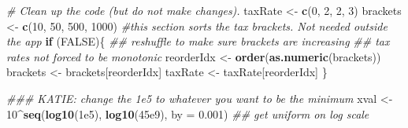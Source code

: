 \documentclass[]{article}
\newenvironment{Shaded}{\begin{snugshade}}{\end{snugshade}}
\newcommand{\CommentTok}[1]{\textcolor[rgb]{0.56,0.35,0.01}{\textit{#1}}}
\newcommand{\ControlFlowTok}[1]{\textcolor[rgb]{0.13,0.29,0.53}{\textbf{#1}}}
\newcommand{\DataTypeTok}[1]{\textcolor[rgb]{0.13,0.29,0.53}{#1}}
\newcommand{\DecValTok}[1]{\textcolor[rgb]{0.00,0.00,0.81}{#1}}
\newcommand{\FloatTok}[1]{\textcolor[rgb]{0.00,0.00,0.81}{#1}}
\newcommand{\KeywordTok}[1]{\textcolor[rgb]{0.13,0.29,0.53}{\textbf{#1}}}
\newcommand{\NormalTok}[1]{#1}
\newcommand{\OperatorTok}[1]{\textcolor[rgb]{0.81,0.36,0.00}{\textbf{#1}}}
\newcommand{\OtherTok}[1]{\textcolor[rgb]{0.56,0.35,0.01}{#1}}
\newcommand{\StringTok}[1]{\textcolor[rgb]{0.31,0.60,0.02}{#1}}
\begin{document}
\begin{Shaded}
\begin{Highlighting}[]
\CommentTok{# Clean up the code (but do not make changes). }
\NormalTok{taxRate <-}\StringTok{ }\KeywordTok{c}\NormalTok{(}\DecValTok{0}\NormalTok{, }\DecValTok{2}\NormalTok{, }\DecValTok{2}\NormalTok{, }\DecValTok{3}\NormalTok{) }
\NormalTok{brackets <-}\StringTok{ }\KeywordTok{c}\NormalTok{(}\DecValTok{10}\NormalTok{, }\DecValTok{50}\NormalTok{, }\DecValTok{500}\NormalTok{, }\DecValTok{1000}\NormalTok{)}
\CommentTok{#this section sorts the tax brackets. Not needed outside the app    }
\ControlFlowTok{if}\NormalTok{ (}\OtherTok{FALSE}\NormalTok{)\{          }
    \CommentTok{## reshuffle to make sure brackets are increasing}
    \CommentTok{## tax rates not forced to be monotonic}
\NormalTok{    reorderIdx <-}\StringTok{ }\KeywordTok{order}\NormalTok{(}\KeywordTok{as.numeric}\NormalTok{(brackets))}
\NormalTok{    brackets <-}\StringTok{ }\NormalTok{brackets[reorderIdx]}
\NormalTok{    taxRate <-}\StringTok{ }\NormalTok{taxRate[reorderIdx]}
\NormalTok{\}}
    
\CommentTok{### KATIE: change the 1e5 to whatever you want to be the minimum}
\NormalTok{xval <-}\StringTok{ }\DecValTok{10}\OperatorTok{^}\KeywordTok{seq}\NormalTok{(}\KeywordTok{log10}\NormalTok{(}\FloatTok{1e5}\NormalTok{), }\KeywordTok{log10}\NormalTok{(}\FloatTok{45e9}\NormalTok{), }\DataTypeTok{by =} \FloatTok{0.001}\NormalTok{) }\CommentTok{## get uniform on log scale}
 

\end{Highlighting}
\end{Shaded}
\end{document}
